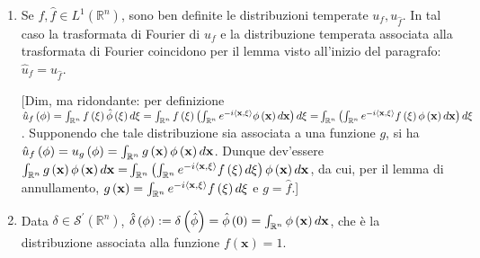 \documentclass{article}
\begin{document}
\begin{enumerate}
\item Se $f,\hat{f}\in L^{1}\left( 
\mathbb{R}
^{n}\right) $, sono ben definite le distribuzioni temperate $u_{f},u_{\hat{f}%
}$. In tal caso la trasformata di Fourier di $u_{f}$ e la distribuzione
temperata associata alla trasformata di Fourier coincidono per il lemma
visto all'inizio del paragrafo: $\hat{u}_{f}=u_{\hat{f}}$.

[Dim, ma ridondante: per definizione $\hat{u}_{f}\left( \phi \right) =\int_{%
\mathbb{R}
^{n}}f\left( \mathbf{\xi }\right) \hat{\phi}\left( \mathbf{\xi }\right) d%
\mathbf{\xi }=\int_{%
\mathbb{R}
^{n}}f\left( \mathbf{\xi }\right) \left( \int_{%
\mathbb{R}
^{n}}e^{-i\left\langle \mathbf{x,\xi }\right\rangle }\phi \left( \mathbf{x}%
\right) d\mathbf{x}\right) d\mathbf{\xi =}\int_{%
\mathbb{R}
^{n}}\left( \int_{%
\mathbb{R}
^{n}}e^{-i\left\langle \mathbf{x,\xi }\right\rangle }f\left( \mathbf{\xi }%
\right) \phi \left( \mathbf{x}\right) d\mathbf{x}\right) d\mathbf{\xi }$.
Supponendo che tale distribuzione sia associata a una funzione $g$, si ha $%
\hat{u}_{f}\left( \phi \right) =u_{g}\left( \phi \right) =\int_{%
\mathbb{R}
^{n}}g\left( \mathbf{x}\right) \phi \left( \mathbf{x}\right) d\mathbf{x}$.
Dunque dev'essere $\int_{%
\mathbb{R}
^{n}}g\left( \mathbf{x}\right) \phi \left( \mathbf{x}\right) d\mathbf{x=}%
\int_{%
\mathbb{R}
^{n}}\left( \int_{%
\mathbb{R}
^{n}}e^{-i\left\langle \mathbf{x,\xi }\right\rangle }f\left( \mathbf{\xi }%
\right) d\mathbf{\xi }\right) \phi \left( \mathbf{x}\right) d\mathbf{x}$, da
cui, per il lemma di annullamento, $g\left( \mathbf{x}\right) =\int_{%
\mathbb{R}
^{n}}e^{-i\left\langle \mathbf{x,\xi }\right\rangle }f\left( \mathbf{\xi }%
\right) d\mathbf{\xi }$ e $g=\hat{f}$.]

\item Data $\delta \in \mathcal{S}^{\prime }\left( 
\mathbb{R}
^{n}\right) $, $\hat{\delta}\left( \phi \right) :=\delta \left( \hat{\phi}%
\right) =\hat{\phi}\left( 0\right) =\int_{%
\mathbb{R}
^{n}}\phi \left( \mathbf{x}\right) d\mathbf{x}$, che \`{e} la distribuzione
associata alla funzione $f\left( \mathbf{x}\right) =1$.
\end{enumerate}
\end{document}
